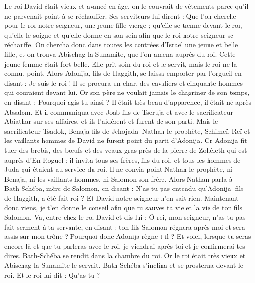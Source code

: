 \begin{multicols}{2}
\VerseOne{}Le roi David était vieux et avancé en âge, on le couvrait de vêtements parce qu'il ne parvenait point à se réchauffer.
Ses serviteurs lui dirent : Que l'on cherche pour le roi notre seigneur, une jeune fille vierge ; qu'elle se tienne devant le roi, qu'elle le soigne et qu'elle dorme en son sein afin que le roi notre seigneur se réchauffe.
On chercha donc dans toutes les contrées d'Israël une jeune et belle fille, et on trouva Abischag la Sunamite, que l'on amena auprès du roi.
Cette jeune femme était fort belle. Elle prit soin du roi et le servit, mais le roi ne la connut point.
Alors Adonija, fils de Haggith, se laissa emporter par l'orgueil en disant : Je suis le roi ! Il se procura un char, des cavaliers et cinquante hommes qui couraient devant lui.
Or son père ne voulait jamais le chagriner de son temps, en disant : Pourquoi agis-tu ainsi ? Il était très beau d'apparence, il était né après Absalom.
Et il communiqua avec Joab fils de Tseruja et avec le sacrificateur Abiathar sur ses affaires, et ils l'aidèrent et furent de son parti.
Mais le sacrificateur Tsadok, Benaja fils de Jehojada, Nathan le prophète, Schimeï, Reï et les vaillants hommes de David ne furent point du parti d'Adonija.
Or Adonija fit tuer des brebis, des bœufs et des veaux gras près de la pierre de Zohéleth qui est auprès d'En-Roguel ; il invita tous ses frères, fils du roi, et tous les hommes de Juda qui étaient au service du roi.
Il ne convia point Nathan le prophète, ni Benaja, ni les vaillants hommes, ni Salomon son frère.
Alors Nathan parla à Bath-Schéba, mère de Salomon, en disant : N'as-tu pas entendu qu'Adonija, fils de Haggith, a été fait roi ? Et David notre seigneur n'en sait rien.
Maintenant donc viens, je t'en donne le conseil afin que tu sauves ta vie et la vie de ton fils Salomon.
Va, entre chez le roi David et dis-lui : Ô roi, mon seigneur, n'as-tu pas fait serment à ta servante, en disant : ton fils Salomon régnera après moi et sera assis sur mon trône ? Pourquoi donc Adonija règne-t-il ?
Et voici, lorsque tu seras encore là et que tu parleras avec le roi, je viendrai après toi et je confirmerai tes dires.
Bath-Schéba se rendit dans la chambre du roi. Or le roi était très vieux et Abischag la Sunamite le servait.
Bath-Schéba s'inclina et se prosterna devant le roi. Et le roi lui dit : Qu'as-tu ?

\end{multicols}
